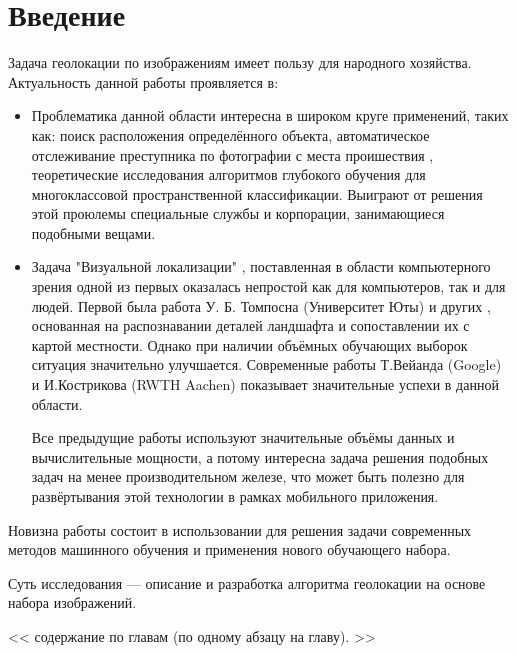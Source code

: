 \chapter*{Введение}
\label{sec:afterwords}

Задача геолокации по изображениям имеет пользу для народного хозяйства.
Актуальность данной работы проявляется в:
	\begin{itemize}
		\item Проблематика данной области интересна в широком круге применений, таких как: 
		поиск расположения определённого объекта, автоматическое отслеживание преступника по фотографии с места проишествия , теоретические исследования алгоритмов глубокого обучения для многоклассовой пространственной классификации. Выиграют от решения этой проюлемы специальные службы и корпорации, занимающиеся подобными вещами.
		\item Задача "Визуальной локализации" \cite{im2gps}, поставленная в области
		компьютерного зрения одной из первых оказалась непростой как для компьютеров,
		так и для людей. Первой была работа У. Б. Томпосна (Университет Юты) и других \cite{thompson1999geomReas}, основанная на распознавании деталей ландшафта и сопоставлении их с картой местности.
		Однако при наличии объёмных обучающих выборок ситуация значительно улучшается. Современные работы Т.Вейанда (Google) и И.Кострикова (RWTH Aachen) \cite{weyand2016planet} показывает значительные успехи в данной области.
		
		Все предыдущие работы используют значительные объёмы данных и вычислительные мощности, а потому интересна задача решения подобных задач на менее производительном железе, что может быть полезно для развёртывания этой  технологии в рамках мобильного приложения.
	\end{itemize}
	Новизна работы состоит в использовании для решения задачи современных методов машинного обучения и применения нового обучающего набора.
	
	Суть исследования --- описание и разработка алгоритма геолокации на основе набора изображений.
	
<<	содержание по главам (по одному абзацу на главу). >>

